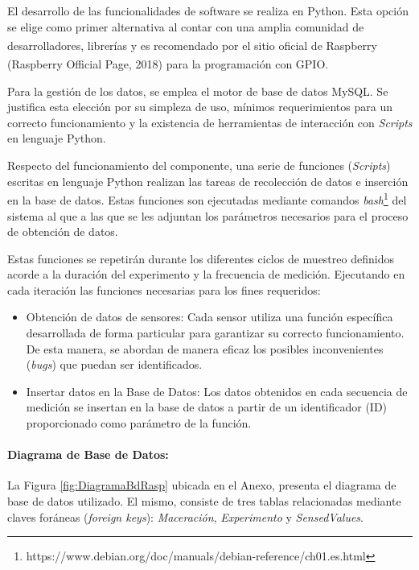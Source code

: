                \par El desarrollo de las funcionalidades de software se realiza en Python. Esta opción se elige como primer alternativa al contar con una amplia comunidad de desarrolladores, librerías y es recomendado por el sitio oficial de Raspberry\textsuperscript{\textregistered} (Raspberry\textsuperscript{\textregistered} Official Page, 2018) para la programación con GPIO.
                
                \par Para la gestión de los datos, se emplea el motor de base de datos MySQL. Se justifica esta elección por su simpleza de uso, mínimos requerimientos para un correcto funcionamiento y la existencia de herramientas de interacción con \textit{Scripts} en lenguaje Python.
                
                \par Respecto del funcionamiento del componente, una serie de funciones (\textit{Scripts}) escritas en lenguaje Python realizan las tareas de recolección de datos e inserción en la base de datos. Estas funciones son ejecutadas mediante comandos \textit{bash}\footnote{https://www.debian.org/doc/manuals/debian-reference/ch01.es.html} del sistema al que a las que se les adjuntan los parámetros necesarios para el proceso de obtención de datos.
                \par Estas funciones se repetirán durante los diferentes ciclos de muestreo definidos acorde a la duración del experimento y la frecuencia de medición. Ejecutando en cada iteración las funciones necesarias para los fines requeridos:
                    
                    \begin{itemize}
                        \item Obtención de datos de sensores: Cada sensor utiliza una función específica desarrollada de forma particular para garantizar su correcto funcionamiento. De esta manera, se abordan de manera eficaz los posibles inconvenientes (\textit{bugs}) que puedan ser identificados.
                        
                        \item Insertar datos en la Base de Datos: Los datos obtenidos en cada secuencia de medición se insertan en la base de datos a partir de un identificador (ID) proporcionado como parámetro de la función.
                    \end{itemize}
                
                \paragraph{Diagrama de Base de Datos:} La Figura \ref{fig:DiagramaBdRasp} ubicada en el Anexo, presenta el diagrama de base de datos utilizado. El mismo, consiste de tres tablas relacionadas mediante claves foráneas (\textit{foreign keys}): \textit{Maceración}, \textit{Experimento} y \textit{SensedValues}. 
                
